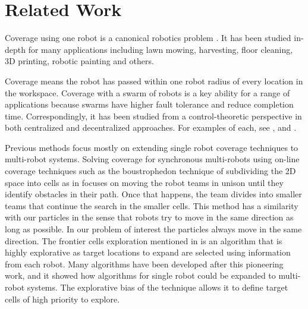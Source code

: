 
\section{Related Work}\label{sec:RelatedWork}

Coverage using one robot is a canonical robotics problem \cite{choset2001coverage}. It has been studied in-depth for many applications including lawn mowing, harvesting, floor cleaning, 3D printing, robotic painting and others. 

Coverage means the robot has passed within one robot radius of every location in the workspace. Coverage with a swarm of robots is a key ability for a range of applications because swarms have higher fault tolerance and reduce completion time. Correspondingly, it has been studied from a control-theoretic perspective in  both centralized and decentralized approaches. For examples of each, see  \cite{zheng2005multi}, and \cite{wagner1999distributed}.

Previous methods focus mostly on extending single robot coverage techniques to multi-robot systems. Solving coverage for synchronous multi-robots using on-line coverage techniques such as the boustrophedon technique of subdividing the 2D space into cells as in \cite{latimer2002towards} focuses on moving the robot teams in unison until they identify obstacles in their path. 
Once that happens, the team divides into smaller teams that continue the search in the smaller cells. 
This method has a similarity with our particles in the sense that robots try to move in the same direction as long as possible. 
In our problem of interest the particles always move in the same direction.  
The frontier cells exploration mentioned in \cite{yamauchi1998frontier} is an algorithm that is highly explorative as target locations to expand are selected using information from each robot.
 Many algorithms have been developed after this pioneering work, and it showed how algorithms for single robot could be expanded to multi-robot systems. 
 The explorative bias of the technique allows it to define target cells of high priority to explore.   

